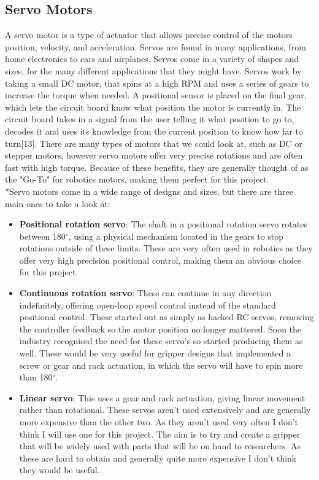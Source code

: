 \documentclass{l4proj}
\begin{document}
\subsection{Servo Motors}
A servo motor is a type of actuator that allows precise control of the motors position, velocity, and acceleration. Servos are found in many applications, from home electronics to cars and airplanes. Servos come in a variety of shapes and sizes, for the many different applications that they might have. Servos work by taking a small DC motor, that spins at a high RPM and uses a series of gears to increase the torque when needed. A positional sensor is placed on the final gear, which lets the circuit board know what position the motor is currently in. The circuit board takes in a signal from the user telling it what position to go to, decodes it and uses its knowledge from the current position to know how far to turn[13]. There are many types of motors that we could look at, such as DC or stepper motors, however servo motors offer very precise rotations and are often fast with high torque. Because of these benefits, they are generally thought of as the "Go-To" for robotics motors, making them perfect for this project. 
\\*Servo motors come in a wide range of designs and sizes, but there are three main ones to take a look at:
\begin{itemize}
	\item 
	\textbf{Positional rotation servo}: The shaft in a positional rotation servo rotates between 180$^{\circ}$, using a physical mechanism located in the gears to stop rotations outside of these limits. These are very often used in robotics as they offer very high precision positional control, making them an obvious choice for this project.
	
	\item
	\textbf{Continuous rotation servo}: These can continue in any direction indefinitely, offering open-loop speed control instead of the standard positional control. These started out as simply as hacked RC servos, removing the controller feedback so the motor position no longer mattered. Soon the industry recognised the need for these servo's so started producing them as well. These would be very useful for gripper designs that implemented a screw or gear and rack actuation, in which the servo will have to spin more than 180$^{\circ}$.
	\item
	\textbf{Linear servo}: This uses a gear and rack actuation, giving linear movement rather than rotational. These servos aren't used extensively and are generally more expensive than the other two. As they aren't used very often I don't think I will use one for this project. The aim is to try and create a gripper that will be widely used with parts that will be on hand to researchers. As these are hard to obtain and generally quite more expensive I don't think they would be useful. 
\end{itemize}
\end{document}
